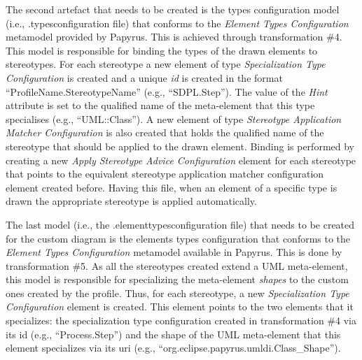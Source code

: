 The second artefact that needs to be created is the types configuration model 
(i.e., .typesconfiguration file) that conforms to the \textit{Element Types 
Configuration} metamodel provided by Papyrus. This is achieved through 
transformation \#4. This model is responsible for binding the types of the 
drawn elements to stereotypes. For each stereotype a new element of type 
\textit{Specialization Type Configuration} is created and a unique \textit{id} 
is created in the format ``ProfileName.StereotypeName'' (e.g., ``SDPL.Step''). 
The value of the \textit{Hint} attribute is set to the qualified name of the 
meta-element that this type specialises (e.g., ``UML::Class''). A new element 
of type \textit{Stereotype Application Matcher Configuration} is also created 
that holds the qualified name of the stereotype that should be applied to the 
drawn element. Binding is performed by creating a new \textit{Apply Stereotype 
Advice Configuration} element for each stereotype that points to the equivalent 
stereotype application matcher configuration element created before. Having 
this file, when an element of a specific type is drawn the appropriate 
stereotype is applied automatically. 

The last model (i.e., the .elementtypesconfiguration file) that needs to be 
created for the custom diagram is the elements types configuration that 
conforms to the \textit{Element Types Configuration} metamodel available in 
Papyrus. This is done by transformation \#5. As all the stereotypes created 
extend a UML meta-element, this model is responsible for specializing the 
meta-element \textit{shapes} to the custom ones created by the profile. Thus, 
for each stereotype, a new \textit{Specialization Type Configuration} element 
is created. This element points to the two elements that it specializes: the 
specialization type configuration created in transformation \#4 via its id 
(e.g., ``Process.Step'') and the shape of the UML meta-element that this 
element specializes via its uri (e.g., 
``org.eclipse.papyrus.umldi.Class\_Shape'').

